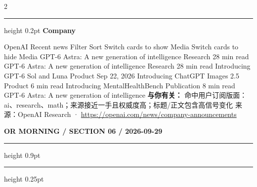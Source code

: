 \documentclass[10.5pt]{ctexart}
\begin{document}
\begin{multicols}{2}
\hrule height 0.2pt
\vspace{2mm}
{\large\bfseries Company}\par
OpenAI Recent news Filter Sort Switch cards to show Media Switch cards to hide Media GPT-6 Astra: A new generation of intelligence Research 28 min read GPT-6 Astra: A new generation of intelligence Research 28 min read Introducing GPT-6 Sol and Luna Product Sep 22, 2026 Introducing ChatGPT Images 2.5 Product 6 min read Introducing MentalHealthBench Publication 8 min read GPT-6 Astra: A new generation of intelligence 
\textbf{与你有关：} 命中用户订阅版面：ai、research、math；来源接近一手且权威度高；标题/正文包含高信号变化
{\footnotesize\color{ormuted} 来源：OpenAI Research · \url{https://openai.com/news/company-announcements}}
\end{multicols}
\newpage
{\small\bfseries OR MORNING / SECTION 06 / 2026-09-29}
\vspace{2mm}
\hrule height 0.9pt
\vspace{1.5mm}
\hrule height 0.25pt
\vspace{4mm}
\end{document}

